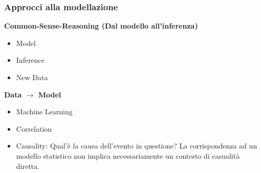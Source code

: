 \subsubsection{Approcci alla modellazione}
\textbf{Common-Sense-Reasoning (Dal modello all'inferenza)} 
\begin{itemize}
    \item Model
    \item Inference
    \item New Data
\end{itemize}
\textbf{Data $\rightarrow$ Model}
\begin{itemize}
    \item Machine Learning
    \item Correlation
    \item Causality: Qual'è la causa dell'evento in questione? La corrispondenza ad un modello statistico non implica necessariamente un contesto di casualità diretta.
\end{itemize}

\newpage
